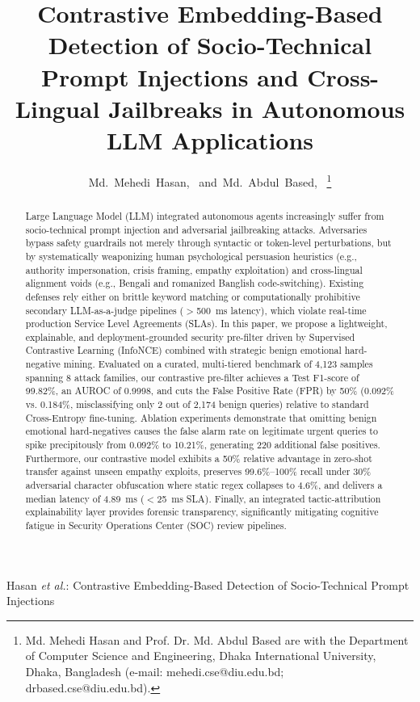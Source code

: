 \documentclass[journal]{IEEEtran}
\begin{document}
\title{Contrastive Embedding-Based Detection of Socio-Technical Prompt Injections and Cross-Lingual Jailbreaks in Autonomous LLM Applications}

\author{Md.~Mehedi~Hasan,~
        and~Md.~Abdul~Based,~%
\thanks{Md. Mehedi Hasan and Prof. Dr. Md. Abdul Based are with the Department of Computer Science and Engineering, Dhaka International University, Dhaka, Bangladesh (e-mail: mehedi.cse@diu.edu.bd; drbased.cse@diu.edu.bd).}}

%
{Hasan \MakeLowercase{\textit{et al.}}: Contrastive Embedding-Based Detection of Socio-Technical Prompt Injections}

\maketitle

\begin{abstract}
Large Language Model (LLM) integrated autonomous agents increasingly suffer from socio-technical prompt injection and adversarial jailbreaking attacks. Adversaries bypass safety guardrails not merely through syntactic or token-level perturbations, but by systematically weaponizing human psychological persuasion heuristics (e.g., authority impersonation, crisis framing, empathy exploitation) and cross-lingual alignment voids (e.g., Bengali and romanized Banglish code-switching). Existing defenses rely either on brittle keyword matching or computationally prohibitive secondary LLM-as-a-judge pipelines ($>$500~ms latency), which violate real-time production Service Level Agreements (SLAs). In this paper, we propose a lightweight, explainable, and deployment-grounded security pre-filter driven by Supervised Contrastive Learning (InfoNCE) combined with strategic benign emotional hard-negative mining. Evaluated on a curated, multi-tiered benchmark of 4,123 samples spanning 8 attack families, our contrastive pre-filter achieves a Test F1-score of 99.82\%, an AUROC of 0.9998, and cuts the False Positive Rate (FPR) by 50\% (0.092\% vs. 0.184\%, misclassifying only 2 out of 2,174 benign queries) relative to standard Cross-Entropy fine-tuning. Ablation experiments demonstrate that omitting benign emotional hard-negatives causes the false alarm rate on legitimate urgent queries to spike precipitously from 0.092\% to 10.21\%, generating 220 additional false positives. Furthermore, our contrastive model exhibits a 50\% relative advantage in zero-shot transfer against unseen empathy exploits, preserves 99.6\%--100\% recall under 30\% adversarial character obfuscation where static regex collapses to 4.6\%, and delivers a median latency of 4.89~ms ($<$25~ms SLA). Finally, an integrated tactic-attribution explainability layer provides forensic transparency, significantly mitigating cognitive fatigue in Security Operations Center (SOC) review pipelines.
\end{abstract}
\end{document}
